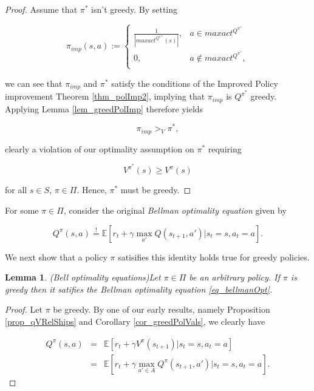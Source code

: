 \documentclass[11pt]{article} %
\newtheorem{lem}{Lemma}
\begin{document}
\begin{proof}
	Assume that $\pi^*$ isn't greedy. By setting

	\begin{equation}
		\pi_{imp}(s,a) :=	\begin{cases}
							\frac{1}{|maxact^{Q^{\pi*}}(s)|}, 	&	 a \in maxact^{Q^{\pi^*}} \\
							0 ,	&	a \notin maxact^{Q^{\pi^*}}, \\ 
						\end{cases}
	\end{equation}

we can see that $\pi_{imp}$ and $\pi^*$ satisfy the conditions of the Improved Policy improvement Theorem \ref{thm_polImp2}, implying that $\pi_{imp}$ is $Q^{\pi^*}$ greedy. Applying Lemma \ref{lem_greedPolImp} therefore yields

\begin{equation}
	\pi_{imp} >_V \pi^*,
\end{equation}

clearly a violation of our optimality assumption on $\pi^*$ requiring

\begin{equation}
	V^{\pi^*}(s) \ge V^{\pi}(s)
\end{equation}

for all $s \in S$, $\pi \in \Pi$. Hence, $\pi^*$ must be greedy.

\end{proof}

For some $\pi \in \Pi$, consider the original \emph{Bellman optimality equation} given by

\begin{equation}\label{eq_bellmanOpt}
	Q^{\pi}(s,a) \overset{!}{=} \mathbb{E}[r_t + \gamma \max\limits_{a'} Q(s_{t+1},a') | s_t = s, a_t = a].
\end{equation}

We next show that a policy $\pi$ satisifies this identity holds true for greedy policies.

\begin{lem}{(Bell optimality equations)}\label{lem_bellmanOptEqs}
	Let $\pi \in \Pi$ be an arbitrary policy. If $\pi$ is greedy then it satifies the Bellman optimality equation \ref{eq_bellmanOpt}.
\end{lem}

\begin{proof}
	Let $\pi$ be greedy. By one of our early results, namely Proposition \ref{prop_qVRelShips} and Corollary \ref{cor_greedPolVals}, we clearly have

\begin{equation}
	\begin{array}{rcl}
		Q^{\pi}(s,a) 	&	=	& \mathbb{E}[r_t + \gamma V^{\pi}(s_{t+1}) | s_t = s, a_t = a] \\
					&	=	& \mathbb{E}[r_t + \gamma \max\limits_{a' \in A} Q^{\pi}(s_{t+1},a') | s_t = s, a_t = a].
	\end{array}
\end{equation}

\end{proof}
\end{document}
